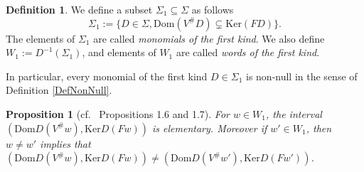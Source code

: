 \documentclass[12pt]{amsart}
\newtheorem{proposition}[theorem]{Proposition}
\theoremstyle{definition}
\newtheorem{definition}[theorem]{Definition}
\newcommand{\<}{\langle}   %
\renewcommand{\>}{\rangle} %
\begin{document}
\begin{definition}
    We define a subset $\Sigma_1 \subseteq  \Sigma$ as follows
    \begin{equation*}
        \Sigma_1 := \{D \in \Sigma, \mathrm{Dom}(V^{\#}D) \subsetneq \mathrm{Ker}(FD)\}.
    \end{equation*}
    The elements of $\Sigma_1$ are called \textit{monomials of the first kind}. We also define $W_1 := D^{-1}(\Sigma_1)$, and elements of $W_1$ are called \textit{words of the first kind}.
\end{definition}

In particular, every monomial of the first kind $D \in \Sigma_1$ is non-null in the sense of Definition \ref{DefNonNull}.

\begin{proposition}[cf.~\cite{gelfand-ponomarev:1968} Propositions 1.6 and 1.7]\label{MonomialOfFirstKind}
    For $w \in W_1$, the interval $(\mathrm{Dom}D(V^{\#}w),\mathrm{Ker}D(Fw))$ is elementary. Moreover if $w'\in W_1$, then $w \not = w'$ implies that $(\mathrm{Dom}D(V^{\#}w),\mathrm{Ker}D(Fw)) \not = (\mathrm{Dom}D(V^{\#}w'),\mathrm{Ker}D(Fw'))$.
\end{proposition}
\end{document}
